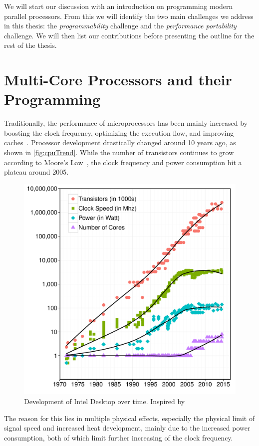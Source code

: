 \noindent
We will start our discussion with an introduction on programming modern parallel processors.
From this we will identify the two main challenges we address in this thesis:
the \emph{programmability} challenge and the \emph{performance portability} challenge.
We will then list our contributions before presenting the outline for the rest of the thesis.

\section{Multi-Core Processors and their Programming}

Traditionally, the performance of microprocessors has been mainly increased by boosting the clock frequency, optimizing the execution flow, and improving caches~\cite{Sutter2005}.
Processor development drastically changed around 10 years ago, as shown in \autoref{fig:cpuTrend}.
While the number of transistors continues to grow according to Moore's Law~\cite{Moore1998}, the clock frequency and power consumption hit a plateau around 2005.
\begin{figure}
  \centering
  \includegraphics[width=.9\linewidth]{Figures/intelCPUTrend}
  \caption{Development of Intel Desktop \CPUs over time. Inspired by~\cite{Sutter2005}}
  \label{fig:cpuTrend}
\end{figure}
The reason for this lies in multiple physical effects, especially the physical limit of signal speed and increased heat development,  mainly due to the increased power consumption, both of which limit further increasing of the clock frequency.
